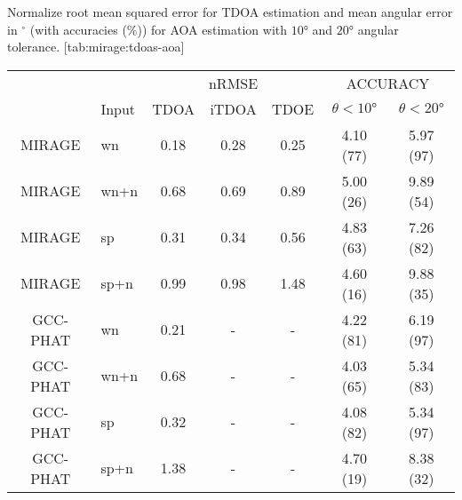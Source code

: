 \begin{table}[ht!]
    \begin{sidecaption}{%
        Normalize root mean squared error for TDOA estimation and mean angular error in ${}^\circ$ (with accuracies ($\%$))
        for AOA estimation with $\ang{10}$ and $\ang{20}$ angular tolerance.
    }[tab:mirage:tdoas-aoa]
    \centering
    \footnotesize
    \begin{tabular}{cl|ccc|cc}
    \toprule
                &         &          & nRMSE        &                   &\multicolumn{2}{c}{ACCURACY}  \\
                & Input   &    \scriptsize{TDOA}  	&   \scriptsize{iTDOA} 		 &     \scriptsize{TDOE} 		 & $\theta<\ang{10}$ &  $\theta<\ang{20}$ \\
    \midrule
    MIRAGE      &   wn    & 0.18    & 0.28  & 0.25 	& 4.10 (77)	& 5.97 (97) \\
    MIRAGE      &   wn+n  & 0.68    & 0.69  & 0.89 	& 5.00 (26)	& 9.89 (54) \\
    MIRAGE      &   sp    & 0.31    & 0.34  & 0.56  & 4.83 (63)	& 7.26 (82) \\
    MIRAGE      &   sp+n  & 0.99    & 0.98  & 1.48 	& 4.60 (16)	& 9.88 (35) \\
    GCC-PHAT    &   wn    & 0.21    & -     & -		& 4.22 (81) & 6.19 (97) \\
    GCC-PHAT    &   wn+n  & 0.68    & -     & -		& 4.03 (65) & 5.34 (83) \\
    GCC-PHAT    &   sp 	  & 0.32    & -     & -		& 4.08 (82) & 5.34 (97) \\
    GCC-PHAT    &   sp+n  & 1.38    & -     & -		& 4.70 (19) & 8.38 (32) \\
    \bottomrule
    \end{tabular}
    \end{sidecaption}
\end{table}

